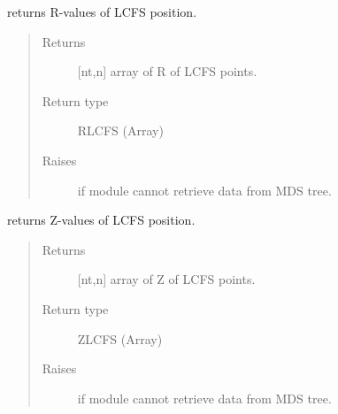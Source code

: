 \documentclass[letterpaper,10pt,english]{sphinxmanual}
\begin{document}
\begin{fulllineitems}
\begin{fulllineitems}
\begin{quote}
\begin{description}
\end{description}\end{quote}

\end{fulllineitems}


\begin{fulllineitems}
\label{\detokenize{eqtools:eqtools.CModEFIT.CModEFITTree.getRLCFS}}
returns R-values of LCFS position.
\begin{quote}\begin{description}
\item[{Returns}] \leavevmode
{[}nt,n{]} array of R of LCFS points.

\item[{Return type}] \leavevmode
RLCFS (Array)

\item[{Raises}] \leavevmode
{} \textendash{} if module cannot retrieve data from MDS tree.

\end{description}\end{quote}

\end{fulllineitems}


\begin{fulllineitems}
\label{\detokenize{eqtools:eqtools.CModEFIT.CModEFITTree.getZLCFS}}
returns Z-values of LCFS position.
\begin{quote}\begin{description}
\item[{Returns}] \leavevmode
{[}nt,n{]} array of Z of LCFS points.

\item[{Return type}] \leavevmode
ZLCFS (Array)

\item[{Raises}] \leavevmode
{} \textendash{} if module cannot retrieve data from MDS tree.

\end{description}\end{quote}


\end{fulllineitems}
\end{fulllineitems}
\end{document}
